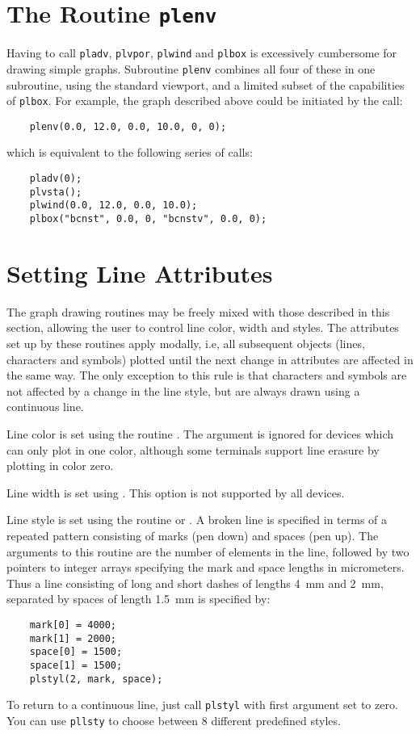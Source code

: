 
\section {The Routine {\tt plenv}}\label{plenv-sec}

Having to call {\tt pladv}, {\tt plvpor}, {\tt plwind} and {\tt plbox}
is excessively cumbersome for drawing simple graphs. Subroutine {\tt plenv}
combines all four of these in one subroutine, using the
standard viewport, and a limited subset of the capabilities of {\tt plbox}.
For example, the graph described above could be initiated by the call:
\begin{verbatim}
    plenv(0.0, 12.0, 0.0, 10.0, 0, 0);
\end{verbatim}
which is equivalent to the following series of calls:
\begin{verbatim}
    pladv(0);
    plvsta();
    plwind(0.0, 12.0, 0.0, 10.0);
    plbox("bcnst", 0.0, 0, "bcnstv", 0.0, 0);
\end{verbatim}


\section {Setting Line Attributes}

The graph drawing routines may be freely mixed with those described in
this section, allowing the user to control line color, width and styles.
The attributes set up by these routines apply modally, i.e, all subsequent
objects (lines, characters and symbols) plotted until the next change in
attributes are affected in the same way. The only exception to this rule
is that characters and symbols are not affected by a change in the line
style, but are always drawn using a continuous line.

Line color \label{color} is set using the routine . The argument
is ignored for devices which can only plot in one color, although some
terminals support line erasure by plotting in color zero. 

Line width \label{width} is set using . This option is not
supported by all devices.

Line style \label{style} is set using the routine 
or . A broken
line is specified in terms of a repeated pattern consisting of marks
(pen down) and spaces (pen up). The arguments to this routine are
the number of elements in the line, followed by two pointers to
integer arrays specifying
the mark and space lengths in micrometers. Thus a line consisting of
long and short dashes of lengths 4\, mm and 2\, mm, separated by spaces of
length 1.5\, mm is specified by:
\begin{verbatim}
    mark[0] = 4000;
    mark[1] = 2000;
    space[0] = 1500;
    space[1] = 1500;
    plstyl(2, mark, space);
\end{verbatim}
To return to a continuous line, just call {\tt plstyl} with first argument
set to zero. You can use {\tt pllsty} to choose between 8 different
predefined styles.

